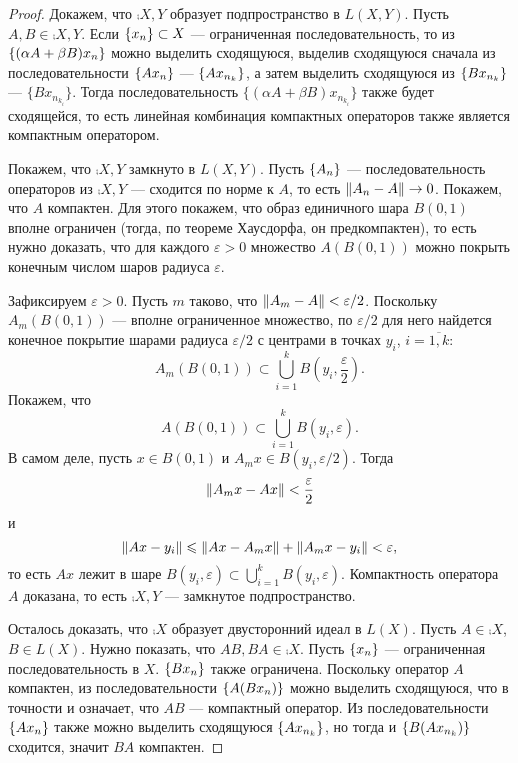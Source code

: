 \begin{proof}
    Докажем, что $\comp{X,Y}$ образует подпространство в $L(X, Y)$. Пусть $A, B \in \comp{X, Y}$.
    Если $\left\{x_n\right\} \subset X$ --- ограниченная последовательность, то из
    $\left\{(\alpha A + \beta B)x_n\right\}$ можно выделить сходящуюся,
    выделив сходящуюся сначала из последовательности $\left\{Ax_n\right\}$ --- $\left\{Ax_{n_k}\right\}$, а 
    затем выделить сходящуюся из $\left\{Bx_{n_k}\right\}$ --- $\{Bx_{n_{k_i}}\}$. Тогда 
    последовательность
    $\{(\alpha A + \beta B)x_{n_{k_i}}\}$ также будет сходящейся, то есть линейная комбинация
    компактных операторов также является компактным оператором.

    Покажем, что $\comp{X,Y}$ замкнуто в $L(X,Y)$. Пусть $\left\{A_n\right\}$ --- последовательность 
    операторов из $\comp{X,Y}$ --- сходится
    по норме к $A$, то есть $\left\|A_n - A\right\| \to 0$. Покажем, что $A$ компактен. Для этого покажем,
    что образ единичного шара $B(0,1)$ вполне ограничен (тогда, по теореме Хаусдорфа, он
    предкомпактен), то есть нужно доказать, что для каждого $\varepsilon > 0$ множество $A(B(0,1))$
    можно покрыть конечным числом шаров радиуса $\varepsilon$.

    Зафиксируем $\varepsilon > 0$. Пусть $m$ таково, что $\left\|A_m - A\right\| < \varepsilon/2$.
    Поскольку $A_m(B(0,1))$ --- вполне ограниченное множество, по $\varepsilon/2$ для него найдется 
    конечное покрытие шарами радиуса $\varepsilon/2$ с центрами в точках $y_i$, 
    $i = \overline{1,k}$:
    \[ A_m(B(0,1)) \subset \bigcup_{i=1}^k B(y_i, \frac{\varepsilon}{2}). \]
    Покажем, что 
    \[ A(B(0,1)) \subset \bigcup_{i=1}^k B(y_i, \varepsilon). \]
    В самом деле, пусть $x \in B(0, 1)$ и $A_mx \in B(y_i, \varepsilon/2)$. Тогда
    \[ \left\|A_mx - Ax\right\| < \frac{\varepsilon}{2} \]
    и
    \[ \left\|Ax - y_i\right\| \leqslant \left\|Ax - A_mx\right\| + \left\|A_mx - y_i\right\| < \varepsilon, \]
    то есть $Ax$ лежит в шаре $B(y_i, \varepsilon) \subset \bigcup_{i=1}^k B(y_i, \varepsilon)$.
    Компактность оператора $A$ доказана, то есть $\comp{X,Y}$ --- замкнутое подпространство.

    Осталось доказать, что $\comp{X}$ образует двусторонний идеал в $L(X)$. Пусть $A \in \comp{X}$,
    $B \in L(X)$. Нужно показать, что $AB, BA \in \comp{X}$. Пусть $\left\{x_n\right\}$ --- ограниченная
    последовательность в $X$. $\left\{Bx_n\right\}$ также ограничена. Поскольку оператор $A$ компактен,
    из последовательности $\left\{A(Bx_n)\right\}$ можно выделить сходящуюся, что в точности и означает,
    что $AB$ --- компактный оператор. Из последовательности $\left\{Ax_n\right\}$ также можно выделить сходящуюся
    $\left\{Ax_{n_k}\right\}$, но тогда и $\left\{B(Ax_{n_k})\right\}$ сходится, значит $BA$
    компактен.
\end{proof}

